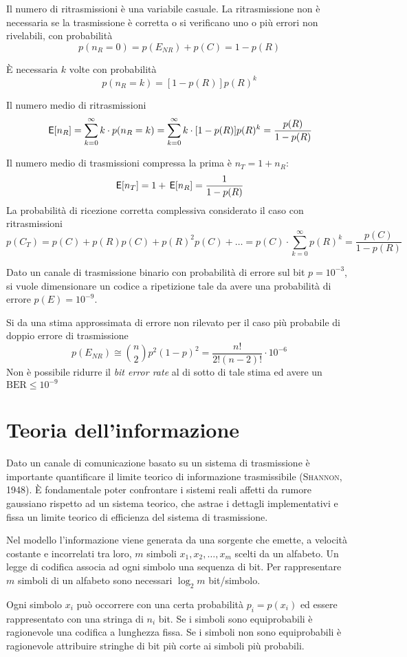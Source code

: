 Il numero di ritrasmissioni è una variabile casuale.
La ritrasmissione non è necessaria se la trasmissione è corretta o si verificano uno o più errori non rivelabili, con probabilità \[p(n_R=0)=p(E_{NR})+p(C)=1-p(R)\]

\`{E} necessaria $k$ volte con probabilità \[p(n_R=k)=[1-p(R)]p(R)^k\]

Il numero medio di ritrasmissioni
\[\,{\operatorname{\mathsf{E}}}\!\left[{n_R}\right]=\sum_{k=0}^{\infty}k\cdot p(n_R=k)=\sum_{k=0}^{\infty}k\cdot[1-p(R)]p(R)^k=\frac{p(R)}{1-p(R)}\]

Il numero medio di trasmissioni compressa la prima è $n_T=1+n_R$:
\[\,{\operatorname{\mathsf{E}}}\!\left[{n_T}\right]=1+\,{\operatorname{\mathsf{E}}}\!\left[{n_R}\right]=\frac{1}{1-p(R)}\]
La probabilità di ricezione corretta complessiva considerato il caso con ritrasmissioni
\[p(C_T)=p(C)+p(R)p(C)+p(R)^2p(C)+\dots=p(C)\cdot\sum_{k=0}^{\infty}p(R)^k=\frac{p(C)}{1-p(R)}\]

\begin{esempio}
Dato un canale di trasmissione binario con probabilità di errore sul bit $p=10^{-3}$, si vuole dimensionare un codice a ripetizione tale da avere una probabilità di errore $p(E)=10^{-9}$.

Si da una stima approssimata di errore non rilevato per il caso più probabile di doppio errore di trasmissione
\[p(E_{NR})\cong\binom{n}{2}p^2(1-p)^2=\frac{n!}{2!(n-2)!}\cdot 10^{-6}\]
Non è possibile ridurre il \emph{bit error rate} al di sotto di tale stima ed avere un $\text{BER}\leq 10^{-9}$
\end{esempio}

\section{Teoria dell'informazione}
Dato un canale di comunicazione basato su un sistema di trasmissione è importante quantificare il limite teorico di informazione trasmissibile (\textsc{Shannon}, 1948). \`{E} fondamentale poter confrontare i sistemi reali affetti da rumore gaussiano rispetto ad un sistema teorico, che astrae i dettagli implementativi e fissa un limite teorico di efficienza del sistema di trasmissione.

Nel modello l'informazione viene generata da una sorgente che emette, a velocità costante e incorrelati tra loro, $m$ simboli $x_1,x_2,\dots,x_m$ scelti da un alfabeto. Un legge di codifica associa ad ogni simbolo una sequenza di bit. Per rappresentare $m$ simboli di un alfabeto sono necessari $\log_2 m$ bit/simbolo.

Ogni simbolo $x_i$ può occorrere con una certa probabilità $p_i=p(x_i)$ ed essere rappresentato con una stringa di $n_i$ bit.
Se i simboli sono equiprobabili è ragionevole una codifica a lunghezza fissa. Se i simboli non sono equiprobabili è ragionevole attribuire stringhe di bit più corte ai simboli più probabili.

